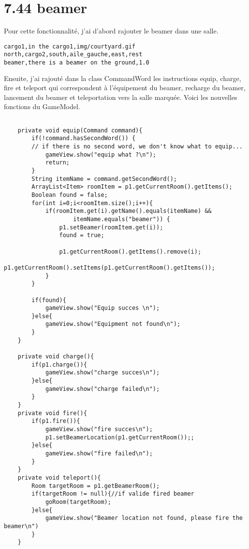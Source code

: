 \documentclass[a4paper , 10pt]{article}
\begin{document}
\section{7.44 beamer}
Pour cette fonctionnalité, j'ai d'abord rajouter le beamer dans une salle.
\begin{verbatim}
cargo1,in the cargo1,img/courtyard.gif
north,cargo2,south,aile_gauche,east,rest
beamer,there is a beamer on the ground,1.0
\end{verbatim}

Ensuite, j'ai rajouté dans la class CommandWord les instructions equip, charge, fire et teleport 
qui correspondent à l'équipement du beamer, recharge du beamer, lancement du beamer et teleportation vers la salle marquée.
Voici les nouvelles fonctions du GameModel.
\begin{verbatim}
    
    private void equip(Command command){        
        if(!command.hasSecondWord()) {
        // if there is no second word, we don't know what to equip...
            gameView.show("equip what ?\n");
            return;
        }
        String itemName = command.getSecondWord();
        ArrayList<Item> roomItem = p1.getCurrentRoom().getItems();
        Boolean found = false; 
        for(int i=0;i<roomItem.size();i++){
            if(roomItem.get(i).getName().equals(itemName) && 
                    itemName.equals("beamer")) {
                p1.setBeamer(roomItem.get(i));
                found = true;

                p1.getCurrentRoom().getItems().remove(i);
                p1.getCurrentRoom().setItems(p1.getCurrentRoom().getItems());
            }
        }

        if(found){
            gameView.show("Equip succes \n");
        }else{
            gameView.show("Equipment not found\n");    
        }
    }

    private void charge(){
        if(p1.charge()){
            gameView.show("charge succes\n");
        }else{
            gameView.show("charge failed\n");    
        }
    }
    private void fire(){
        if(p1.fire()){
            gameView.show("fire succes\n");
            p1.setBeamerLocation(p1.getCurrentRoom());;
        }else{
            gameView.show("fire failed\n");    
        }
    }
    private void teleport(){
        Room targetRoom = p1.getBeamerRoom();
        if(targetRoom != null){//if valide fired beamer
            goRoom(targetRoom);
        }else{
            gameView.show("Beamer location not found, please fire the beamer\n")
        }
    }

\end{verbatim}
\end{document}

